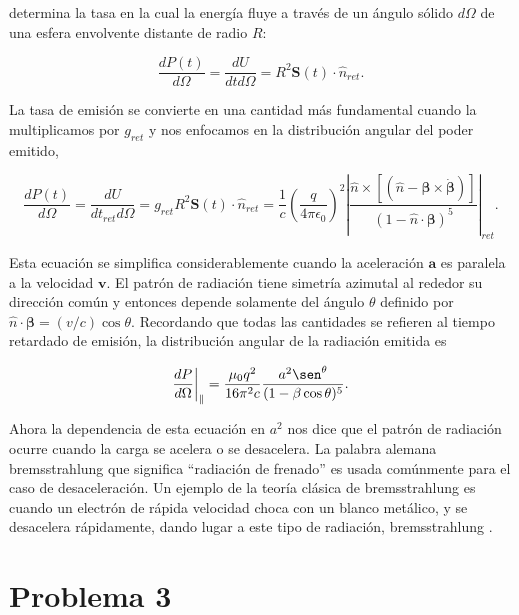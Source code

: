\documentclass[a4paper,11pt]{article}
\numberwithin{equation}{section}
\newcommand{\zerodel}{.\kern-\nulldelimiterspace}
\begin{document}
determina la tasa en la cual la energía fluye a través de un ángulo sólido $d\Omega$ 
de una esfera envolvente distante de radio $R$:

\begin{equation}
 \frac{dP(t)}{d\Omega} = \frac{dU}{dtd\Omega} = R^2 \mathbf{S}(t) \cdot \hat{n}_{ret}.
\end{equation}

La tasa de emisión se convierte en una cantidad más fundamental cuando 
la multiplicamos por $g_{ret}$ y nos enfocamos en la distribución angular del 
poder emitido, 

\begin{equation}
 \frac{dP(t)}{d\Omega} = \frac{dU}{dt_{ret}d\Omega} = g_{ret} R^2 \mathbf{S}(t) 
 \cdot \hat{n}_{ret} = \frac{1}{c}\left(\frac{q}{4\pi\epsilon_0}\right)^2 
 \left|\frac{\hat{n} \times [(\hat{n} - 
 \pmb{\beta} \times \dot{\pmb{\beta}})]}{(1 - \hat{n}\cdot \pmb{\beta})^5}\right|_{ret}.
\end{equation}

Esta ecuación se simplifica considerablemente cuando la aceleración $\mathbf{a}$ es 
paralela a la velocidad $\mathbf{v}$. El patrón de radiación tiene simetría 
azimutal al rededor su dirección común y entonces depende solamente del 
ángulo $\theta$ definido por $\hat{n} \cdot \pmb{\beta} = (v/c)\cos{\theta}$. 
Recordando que todas las cantidades se refieren al tiempo retardado de 
emisión, la distribución angular de la radiación emitida es 

\begin{equation}
 \left\zerodel \frac{dP}{d\Omega}\right|_{\parallel} = \frac{\mu_0q^2}{16\pi^2c} 
 \frac{a^2\sen^{\theta}}{(1 - \beta\cos{\theta})^5}.
\end{equation}

Ahora la dependencia de esta ecuación en $a^2$ nos dice que el patrón de radiación 
ocurre cuando la carga se acelera o se desacelera. La palabra alemana bremsstrahlung 
que significa ``radiación de frenado'' es usada comúnmente para el caso de desaceleración. 
Un ejemplo de la teoría clásica de bremsstrahlung es cuando un electrón de rápida 
velocidad choca con un blanco metálico, y se desacelera rápidamente, dando lugar a 
este tipo de radiación, bremsstrahlung \cite{griffiths}.

\newpage

\section{Problema 3}
\end{document}
